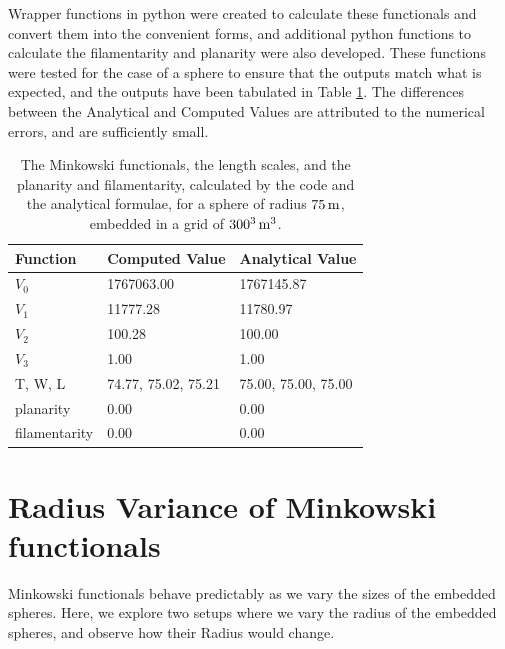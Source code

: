 \documentclass{article}
\newcommand{\m}{{\rm m}}
\begin{document}
Wrapper functions in python were created to calculate these functionals and convert them into the convenient forms, and additional python functions to calculate the filamentarity and planarity were also developed. These functions were tested for the case of a sphere to ensure that the outputs match what is expected, and the outputs have been tabulated in Table \ref{tab:wrapper_function_outputs}. The differences between the Analytical and Computed Values are attributed to the numerical errors, and are sufficiently small.

\begin{table}[]
	\centering
	\begin{tabular}{|l|l|l|}
		\hline
		\textbf{Function} & \textbf{Computed Value} & \textbf{Analytical Value} \\ \hline
		$V_0$             & 1767063.00              & 1767145.87                \\ \hline
		$V_1$             & 11777.28                & 11780.97                  \\ \hline
		$V_2$             & 100.28                  & 100.00                    \\ \hline
		$V_3$             & 1.00                    & 1.00                      \\ \hline
		T, W, L           & 74.77, 75.02, 75.21     & 75.00, 75.00, 75.00       \\ \hline
		planarity         & 0.00                    & 0.00                      \\ \hline
		filamentarity     & 0.00                    & 0.00                      \\ \hline
	\end{tabular}
	\label{tab:wrapper_function_outputs}
	\caption{The Minkowski functionals, the length scales, and the planarity and filamentarity, calculated by the code and the analytical formulae, for a sphere of radius $75\,\m$, embedded in a grid of $300^3\, \m^3$.}
\end{table}


\section{Radius Variance of Minkowski functionals}

Minkowski functionals behave predictably as we vary the sizes of the embedded spheres. Here, we explore two setups where we vary the radius of the embedded spheres, and observe how their Radius would change.
\end{document}
